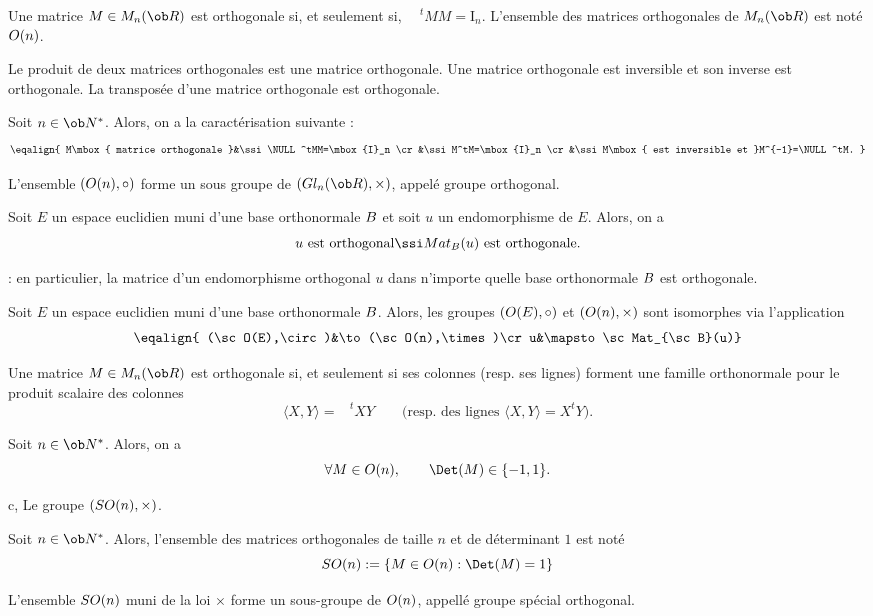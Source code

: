 \Definition []  Une matrice $M\in\sc M_n(\ob R)$ est orthogonale si, et seulement si, $\phantom{\!\!\!\!\!\!M}^tMM=\mbox{I}_n$. \pn
L'ensemble des matrices orthogonales de $\sc M_n(\ob R)$ est noté $\sc O(n)$. 
\bigskip

\Propriete []  Le produit de deux matrices orthogonales est une matrice orthogonale. \pn
Une matrice orthogonale est inversible et son inverse est orthogonale. \pn
La transposée d'une matrice orthogonale est orthogonale. 
\bigskip

\Propriete []  Soit $n\in\ob N^*$. Alors, on a la caractérisation suivante : 
$$
\eqalign{
M\mbox{ matrice orthogonale }&\ssi \NULL^tMM=\mbox{I}_n
\cr
&\ssi M^tM=\mbox{I}_n
\cr
&\ssi M\mbox{ est inversible et }M^{-1}=\NULL^tM.
}
$$

\Propriete []  L'ensemble $(\sc O(n),\circ)$ forme un sous groupe de $(\sc Gl_n(\ob R),\times)$, appelé groupe orthogonal. 
\bigskip

\Propriete []  Soit $E$ un espace euclidien muni d'une base orthonormale $\sc B$ et soit $u$ un endomorphisme de $E$. Alors, on a 
$$
u\mbox{ est orthogonal}\ssi\sc Mat_{\sc B}(u)\mbox{ est orthogonale}.
$$

\Remarque : en particulier, la matrice d'un endomorphisme orthogonal $u$ dans n'importe quelle base orthonormale $\sc B$ est orthogonale. 
\bigskip

\Propriete []  Soit $E$ un espace euclidien muni d'une base orthonormale $\sc B$. Alors, les groupes $(\sc O(E),\circ)$ et $(\sc O(n),\times)$ sont isomorphes via l'application 
$$
\eqalign{ (\sc O(E),\circ)&\to(\sc O(n),\times)\cr  u&\mapsto\sc Mat_{\sc B}(u)}
$$

\Propriete []  Une matrice $M\in\sc M_n(\ob R)$ est orthogonale si, et seulement si ses colonnes (resp. ses lignes) forment une famille orthonormale pour le produit scalaire des colonnes 
$$
\langle X,Y\rangle=\phantom{\!\!\!\!\!\!X}^tXY \qquad \mbox{(resp. des lignes $\langle X,Y\rangle=X^tY$).} 
$$

\Propriete []  Soit $n\in\ob N^*$. Alors, on a 
$$
\forall M\in\sc O(n),\qquad \Det(M)\in\{-1,1\}.
$$



\Subsection c, Le groupe $(\sc{SO}(n),\times)$. 

\Definition []  Soit $n\in\ob N^*$. 
Alors, l'ensemble des matrices orthogonales de taille $n$ et de déterminant $1$ est noté 
$$
\sc{SO}(n):=\{M\in\sc O(n):\Det(M)=1\}
$$

\Propriete []  L'ensemble $\sc{SO}(n)$ muni de la loi $\times$ forme un sous-groupe de $\sc O(n)$, 
appellé groupe spécial orthogonal. 
\bigskip

